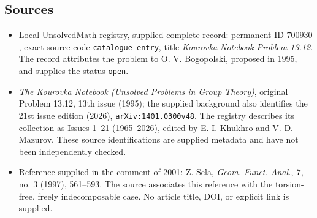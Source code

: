 \documentclass[11pt]{article}
\begin{document}
\subsection{Sources}
\begin{itemize}
\item Local UnsolvedMath registry, supplied complete record: permanent ID \(700930\), exact source code \texttt{catalogue entry}, title \emph{Kourovka Notebook Problem 13.12}. The record attributes the problem to O. V. Bogopolski, proposed in 1995, and supplies the status \texttt{open}.
\item \emph{The Kourovka Notebook (Unsolved Problems in Group Theory)}, original Problem 13.12, 13th issue (1995); the supplied background also identifies the 21st issue edition (2026), \texttt{arXiv:1401.0300v48}. The registry describes its collection as Issues 1--21 (1965--2026), edited by E. I. Khukhro and V. D. Mazurov. These source identifications are supplied metadata and have not been independently checked.
\item Reference supplied in the comment of 2001: Z. Sela, \emph{Geom. Funct. Anal.}, \textbf{7}, no. 3 (1997), 561--593. The source associates this reference with the torsion-free, freely indecomposable case. No article title, DOI, or explicit link is supplied.
\end{itemize}
\end{document}
